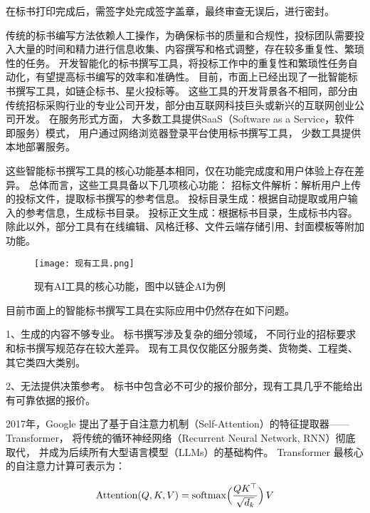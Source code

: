 \documentclass{xmu}
\begin{document}
在标书打印完成后，需签字处完成签字盖章，最终审查无误后，进行密封。

传统的标书编写方法依赖人工操作，为确保标书的质量和合规性，投标团队需要投入大量的时间和精力进行信息收集、内容撰写和格式调整，存在较多重复性、繁琐性的任务。
开发智能化的标书撰写工具，将投标工作中的重复性和繁琐性任务自动化，有望提高标书编写的效率和准确性。
目前，市面上已经出现了一批智能标书撰写工具，如链企标书、星火投标等。
这些工具的开发背景各不相同，部分由传统招标采购行业的专业公司开发，部分由互联网科技巨头或新兴的互联网创业公司开发。
在服务形式方面，
大多数工具提供SaaS（Software as a Service，软件即服务）模式，
用户通过网络浏览器登录平台使用标书撰写工具，
少数工具提供本地部署服务。

这些智能标书撰写工具的核心功能基本相同，仅在功能完成度和用户体验上存在差异。
总体而言，这些工具具备以下几项核心功能：
招标文件解析：解析用户上传的投标文件，提取标书撰写的参考信息。
投标目录生成：根据自动提取或用户输入的参考信息，生成标书目录。
投标正文生成：根据标书目录，生成标书内容。
除此以外，部分工具有在线编辑、风格迁移、文件云端存储引用、封面模板等附加功能。

\begin{figure}[!htb]
    \centering
    \texttt{[image: 现有工具.png]}\\
    \caption{现有AI工具的核心功能，图中以链企AI为例}\label{xmulogo}
\end{figure}

目前市面上的智能标书撰写工具在实际应用中仍然存在如下问题。

1、生成的内容不够专业。
标书撰写涉及复杂的细分领域，
不同行业的招标要求和标书撰写规范存在较大差异。
现有工具仅仅能区分服务类、货物类、工程类、其它类四大类别。

2、无法提供决策参考。
标书中包含必不可少的报价部分，现有工具几乎不能给出有可靠依据的报价。

2017年，Google 提出了基于自注意力机制（Self-Attention）的特征提取器——Transformer，
将传统的循环神经网络（Recurrent Neural Network, RNN）彻底取代，
并成为后续所有大型语言模型（LLMs）的基础构件。
Transformer 最核心的自注意力计算可表示为：

$$
\mathrm{Attention}(Q,K,V) = \mathrm{softmax}\Bigl(\frac{QK^\top}{\sqrt{d_k}}\Bigr)\,V
$$
\end{document}
